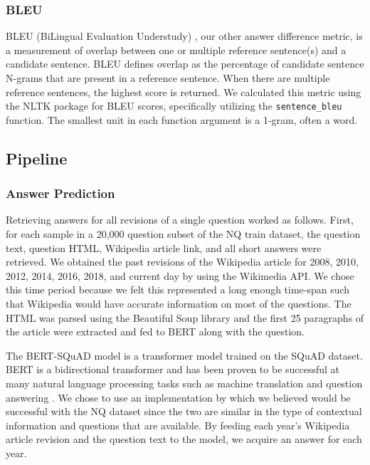 \documentclass{article}
\begin{document}
\subsubsection{BLEU}
\label{bleumetric}


BLEU (BiLingual Evaluation Understudy) \cite{bleu}, our other answer difference metric, is a measurement of overlap between one or multiple reference sentence(s) and a candidate sentence. BLEU defines overlap as the percentage of candidate sentence N-grams that are present in a reference sentence. When there are multiple reference sentences, the highest score is returned. We calculated this metric using the NLTK \cite{nltk} package for BLEU scores, specifically utilizing the {\tt sentence\_bleu} function. The smallest unit in each function argument is a 1-gram, often a word. 


\subsection{Pipeline}
\label{pipeline}

\subsubsection{Answer Prediction}
Retrieving answers for all revisions of a single question worked as follows. First, for each  sample in a 20,000 question subset of the NQ train dataset, the question text, question HTML, Wikipedia article link, and all short answers were retrieved. We obtained the past revisions of the Wikipedia article for 2008, 2010, 2012, 2014, 2016, 2018, and current day by using the Wikimedia API. We chose this time period because we felt this represented a long enough time-span such that Wikipedia would have accurate information on most of the questions. The HTML was parsed using the Beautiful Soup library and the first 25 paragraphs of the article were extracted and fed to BERT along with the question. 

The BERT-SQuAD model is a transformer model trained on the SQuAD dataset. BERT is a bidirectional transformer and has been proven to be successful at many natural language processing tasks such as machine translation and question answering \cite{bert}. We chose to use an implementation by \cite{bertsquad} which we believed would be successful with the NQ dataset since the two are similar in the type of contextual information and questions that are available. By feeding each year’s Wikipedia article revision and the question text to the model, we acquire an answer for each year. 
\end{document}

